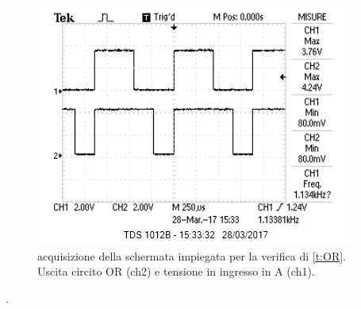 		\begin{figure}[hb]
			\centering
			\includegraphics[scale=0.35]{../Figs-Tabs/or.png}
			\caption{acquisizione della schermata impiegata per la verifica di \tablename{ \ref{t:OR}}.
				Uscita circito OR (ch2) e tensione in ingresso in A (ch1).
			}
			\label{f:osci-or}
		\end{figure}.
